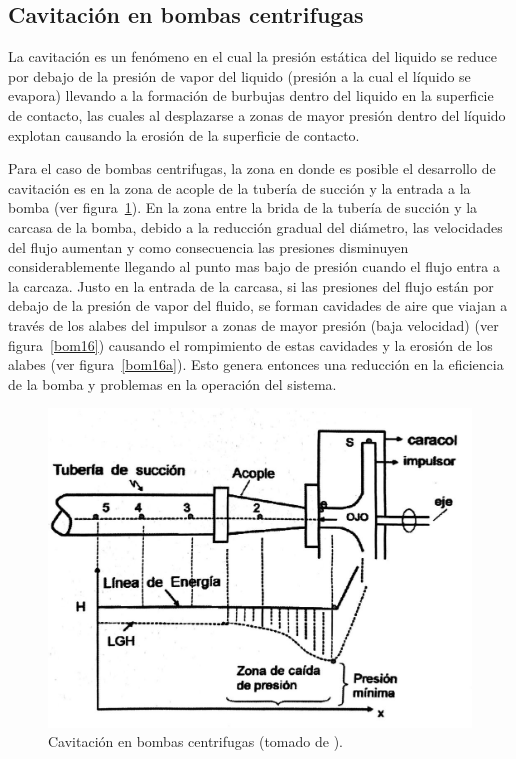 \documentclass[11pt, oneside]{article}
\begin{document}
\subsection{Cavitaci\'on en bombas centrifugas}
La cavitaci\'on es un fen\'omeno en el cual la presi\'on est\'atica del liquido se reduce por debajo de la presi\'on de vapor del liquido (presi\'on a la cual el l\'iquido se evapora) llevando a la formaci\'on de burbujas dentro del liquido en la superficie de contacto, las cuales al desplazarse a zonas de mayor presi\'on dentro del l\'iquido explotan causando la erosi\'on de la superficie de contacto.

Para el caso de bombas centrifugas, la zona en donde es posible el desarrollo de cavitaci\'on es en la zona de acople de la tuber\'ia de succi\'on y la entrada a la bomba (ver figura~\ref{bom17}). En la zona entre la brida de la tuber\'ia de succi\'on y la carcasa de la bomba, debido a la reducci\'on gradual del di\'ametro, las velocidades del flujo aumentan y como consecuencia las presiones disminuyen considerablemente llegando al punto mas bajo de presi\'on cuando el flujo entra a la carcaza. Justo en la entrada de la carcasa, si las presiones del flujo est\'an por debajo de la presi\'on de vapor del fluido, se forman cavidades de aire que viajan a trav\'es de los alabes del impulsor a zonas de mayor presi\'on (baja velocidad) (ver figura~\ref{bom16})  causando el rompimiento de estas cavidades y la erosi\'on de los alabes (ver figura~\ref{bom16a}). Esto genera entonces una reducci\'on en la eficiencia de la bomba y problemas en la operaci\'on del sistema.

\begin{figure}[h]
\centering
\includegraphics[width=12cm]{./figs/bom17.jpeg}
\caption{Cavitaci\'on en bombas centrifugas (tomado de \cite{agudelo2011mecanica}).} 
\label{bom17}
\end{figure}
\end{document}
